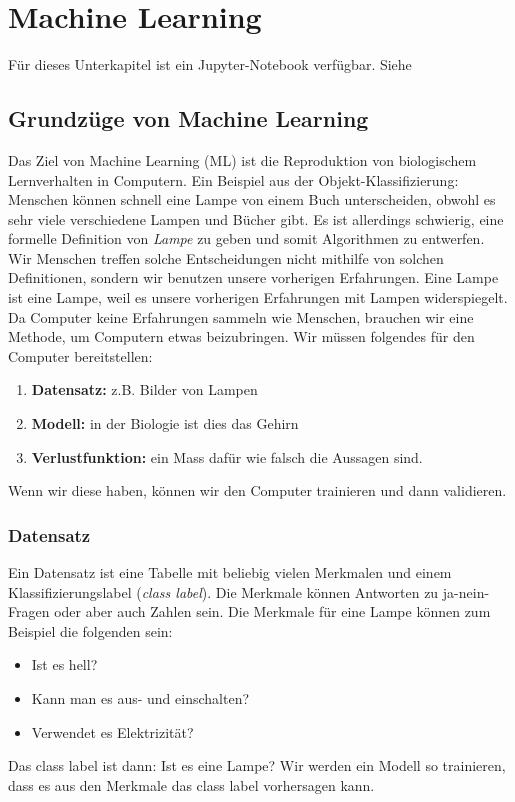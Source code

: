 \chapter{Machine Learning}
\begin{center}
\begin{tcolorbox}[enhanced,width=6in,center upper,
    fontupper=\large,drop fuzzy shadow southwest,
    colframe=blue!50!black,colback=blue!10]
Für dieses Unterkapitel ist ein Jupyter-Notebook verfügbar. Siehe   
\end{tcolorbox}
\end{center}

\section{Grundzüge von Machine Learning}
Das Ziel von Machine Learning (ML) ist die Reproduktion von biologischem Lernverhalten in Computern. 
Ein Beispiel aus der Objekt-Klassifizierung: Menschen können schnell eine Lampe von einem Buch unterscheiden, obwohl es sehr viele verschiedene Lampen und Bücher gibt. 
Es ist allerdings schwierig, eine formelle Definition von \textit{Lampe} zu geben und somit Algorithmen zu entwerfen. 
Wir Menschen treffen solche Entscheidungen nicht mithilfe von solchen Definitionen, sondern wir benutzen unsere vorherigen Erfahrungen. Eine Lampe ist eine Lampe, weil es unsere vorherigen Erfahrungen mit Lampen widerspiegelt.\\

Da Computer keine Erfahrungen sammeln wie Menschen, brauchen wir eine Methode, um Computern etwas beizubringen. 
Wir müssen folgendes für den Computer bereitstellen:
\begin{enumerate}
    \item \textbf{Datensatz: } z.B. Bilder von Lampen
    \item \textbf{Modell: } in der Biologie ist dies das Gehirn
    \item \textbf{Verlustfunktion: } ein Mass dafür wie falsch die Aussagen sind.
\end{enumerate}
Wenn wir diese haben, können wir den Computer trainieren und dann validieren. 

\subsection{Datensatz}
Ein Datensatz ist eine Tabelle mit beliebig vielen Merkmalen und einem Klassifizierungslabel (\textit{class label}). Die Merkmale können Antworten zu ja-nein-Fragen oder aber auch Zahlen sein. Die Merkmale für eine Lampe können zum Beispiel die folgenden sein:
\begin{itemize}
    \item Ist es hell?
    \item Kann man es aus- und einschalten?
    \item Verwendet es Elektrizität?
\end{itemize}
Das class label ist dann: Ist es eine Lampe?
Wir werden ein Modell so trainieren, dass es aus den Merkmale das class label vorhersagen kann. 


